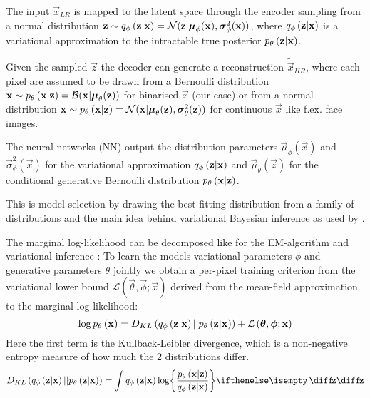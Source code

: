 The input $\vec{x}_{LR}$ is mapped to the latent space through the encoder sampling from a normal distribution
$\bm{\mathrm{z}} \sim q_{\phi}\left(\bm{\mathrm{z}}|\bm{\mathrm{x}}\right) = \mathcal{N}( \bm{\mathrm{z}}|\bm{\mathrm{\mu}}_\phi(\bm{\mathrm{x}}),\bm{\mathrm{\sigma}}^2_\phi(\bm{\mathrm{x}}))$, where $q_{\phi}\left(\bm{\mathrm{z}}|\bm{\mathrm{x}}\right)$ is a variational approximation to the intractable true posterior $p_{\theta}\left(\bm{\mathrm{z}}|\bm{\mathrm{x}}\right)$. 

Given the sampled $\vec{z}$ the decoder can generate a reconstruction $\tilde{\vec{x}}_{HR}$, where each pixel are assumed to be drawn from a Bernoulli distribution $\bm{\mathrm{x}} \sim p_{\theta}\left(\bm{\mathrm{x}}|\bm{\mathrm{z}}\right)=\mathcal{B}( \bm{\mathrm{x}}|\bm{\mathrm{\mu}}_\theta(\bm{\mathrm{z}}))$ for binarised $\vec{x}$ (our case) or from a normal distribution $\bm{\mathrm{x}} \sim p_{\theta}\left(\bm{\mathrm{x}}|\bm{\mathrm{z}}\right)=\mathcal{N}( \bm{\mathrm{x}}|\bm{\mathrm{\mu}}_\theta(\bm{\mathrm{z}}),\bm{\mathrm{\sigma}}^2_\theta(\bm{\mathrm{z}}))$ for continuous $\vec{x}$ like f.ex. face images.

The neural networks (NN) output the distribution parameters $\vec{\mu}_\phi(\vec{x})$ and $\vec{\sigma}^2_\phi(\vec{x})$ for the variational approximation $q_{\phi}\left(\bm{\mathrm{z}}|\bm{\mathrm{x}}\right)$ and $\vec{\mu}_\theta(\vec{z})$ for the conditional generative Bernoulli distribution $p_{\theta}\left(\bm{\mathrm{x}}|\bm{\mathrm{z}}\right)$. 

This is model selection by drawing the best fitting distribution from a family of distributions and the main idea behind variational Bayesian inference as used by \cite{Kingma2013}. 
 
The marginal log-likelihood can be decomposed like for the EM-algorithm and variational inference \cite[\S10.2]{Bishop2006}:
To learn the models variational parameters $\phi$ and generative parameters $\theta$ jointly we obtain a per-pixel training criterion from the variational lower bound $\mathcal{L}\left(\vec{\theta},\vec{\phi};\vec{x}\right)$ derived from the mean-field approximation to the marginal log-likelihood:
\begin{equation}
	\log p_{\theta}\left(\bm{\mathrm{x}}\right) = D_{KL}\left( q_{\phi}\left(\bm{\mathrm{z}}|\bm{\mathrm{x}}\right)||p_{\theta}\left(\bm{\mathrm{z}}|\bm{\mathrm{x}}\right)\right) + \mathcal{L}\left(\bm{\mathrm{\theta}},\bm{\mathrm{\phi}};\bm{\mathrm{x}}\right)
\end{equation} 
Here the first term is the Kullback-Leibler divergence, which is a non-negative entropy measure of how much the 2 distributions differ.
\begin{equation}
	D_{KL}\left( \enc{\vec{z}|\vec{x}}||\dec{\vec{z}|\vec{x}}\right) = \int \enc{\vec{z}|\vec{x}} \log \curlies*{ \frac{\dec{\vec{x}|\vec{z}}}{\enc{\vec{z}|\vec{x}} } } \D{\vec{z}}
\end{equation}

